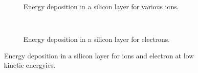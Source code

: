 \begin{figure}[!h]
	\begin{subfigure}[t]{.5\textwidth}
		\centering
		
		\caption[Energy deposition in a silicon layer for various ions]{Energy deposition in a silicon layer for various ions.}
		\label{chap3:ion_si_deposit}
	\end{subfigure}
	~
	\begin{subfigure}[t]{.5\textwidth}
		\centering
		
		\caption[Energy deposition in a silicon layer for electrons]{Energy deposition in a silicon layer for electrons.}
		\label{chap3:electron_si_deposit}
	\end{subfigure}
	\caption[Energy deposition in a silicon layer for ions and electron at low kinetic energyies]{Energy deposition in a silicon layer for ions and electron at low kinetic energyies.}
	\label{chap3:si_deposit}
\end{figure}
